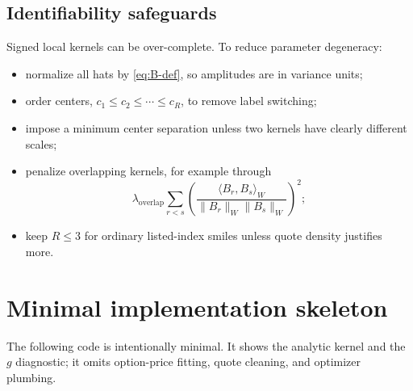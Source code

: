 \documentclass[11pt]{article}
\begin{document}
\subsection{Identifiability safeguards}

Signed local kernels can be over-complete.  To reduce parameter degeneracy:
\begin{itemize}[leftmargin=2em]
  \item normalize all hats by \eqref{eq:B-def}, so amplitudes are in variance units;
  \item order centers, $c_1\le c_2\le\cdots\le c_R$, to remove label switching;
  \item impose a minimum center separation unless two kernels have clearly different scales;
  \item penalize overlapping kernels, for example through
  \begin{equation}
    \lambda_{\mathrm{overlap}}\sum_{r<s}
    \left(
      \frac{\langle B_r,B_s\rangle_W}
           {\|B_r\|_W\|B_s\|_W}
    \right)^2;
  \end{equation}
  \item keep $R\le3$ for ordinary listed-index smiles unless quote density justifies more.
\end{itemize}

\section{Minimal implementation skeleton}

The following code is intentionally minimal.  It shows the analytic kernel and the $g$ diagnostic; it omits option-price fitting, quote cleaning, and optimizer plumbing.
\end{document}
